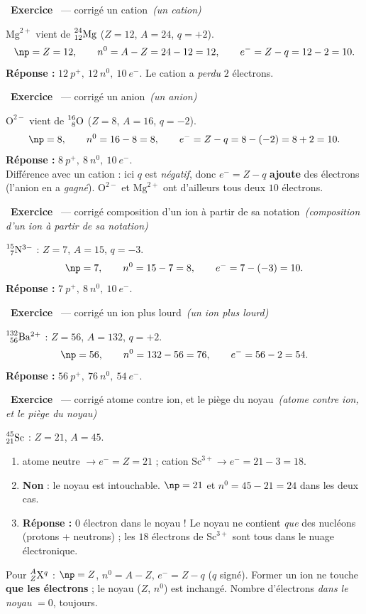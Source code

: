 \documentclass[11pt,a4paper]{article}
\newcommand{\nuc}[3]{\prescript{#1}{#2}{\mathrm{#3}}}
\newcommand{\pp}{p^{+}}
\newcommand{\ee}{e^{-}}
\newcommand{\nz}{n^{0}}
\newcommand{\rep}{\textbf{\color{excol}Réponse : }}
\newcounter{exo}
\newcommand{\cor}[1][]{\stepcounter{exo}\par\medskip%
  \noindent{\color{primary}\rule[-2pt]{3.5pt}{15pt}}\ \textbf{\color{primarydark}\large Exercice \theexo}%
  \ \textmd{\normalsize\color{black!55}— corrigé}%
  \ifx\relax#1\relax\relax\else\ \textmd{\normalsize\color{black!65}\itshape (#1)}\fi\par\nopagebreak\smallskip}
\begin{document}

\cor[un cation]
$\mathrm{Mg}^{2+}$ vient de $\nuc{24}{12}{Mg}$ ($Z=12$, $A=24$, $q=+2$).
\[ \np = Z = 12, \qquad \nz = A - Z = 24 - 12 = 12, \qquad \ee = Z - q = 12 - 2 = 10. \]
\rep $\boxed{12\ \pp,\ 12\ \nz,\ 10\ \ee}$. Le cation a \emph{perdu} $2$ électrons.

\cor[un anion]
$\mathrm{O}^{2-}$ vient de $\nuc{16}{8}{O}$ ($Z=8$, $A=16$, $q=-2$).
\[ \np = 8, \qquad \nz = 16 - 8 = 8, \qquad \ee = Z - q = 8 - (-2) = 8 + 2 = 10. \]
\rep $\boxed{8\ \pp,\ 8\ \nz,\ 10\ \ee}$. \\
Différence avec un cation : ici $q$ est \emph{négatif}, donc $\ee = Z - q$ \textbf{ajoute} des électrons
(l'anion en a \emph{gagné}). $\mathrm{O}^{2-}$ et $\mathrm{Mg}^{2+}$ ont d'ailleurs tous deux $10$
électrons.

\cor[composition d'un ion à partir de sa notation]
$\nuc{15}{7}{N}^{3-}$ : $Z = 7$, $A = 15$, $q = -3$.
\[ \np = 7, \qquad \nz = 15 - 7 = 8, \qquad \ee = 7 - (-3) = 10. \]
\rep $\boxed{7\ \pp,\ 8\ \nz,\ 10\ \ee}$.

\cor[un ion plus lourd]
$\nuc{132}{56}{Ba}^{2+}$ : $Z = 56$, $A = 132$, $q = +2$.
\[ \np = 56, \qquad \nz = 132 - 56 = 76, \qquad \ee = 56 - 2 = 54. \]
\rep $\boxed{56\ \pp,\ 76\ \nz,\ 54\ \ee}$.

\cor[atome contre ion, et le piège du noyau]
$\nuc{45}{21}{Sc}$ : $Z = 21$, $A = 45$.
\begin{enumerate}[label=\alph*)]
  \item atome neutre $\to \ee = Z = 21$ ; cation $\mathrm{Sc}^{3+} \to \ee = 21 - 3 = 18$.
  \item \textbf{Non} : le noyau est intouchable. $\np = 21$ et $\nz = 45 - 21 = 24$ dans les deux cas.
  \item \rep $\boxed{0}$ électron dans le noyau ! Le noyau ne contient \emph{que} des nucléons (protons +
        neutrons) ; les $18$ électrons de $\mathrm{Sc}^{3+}$ sont tous dans le nuage électronique.
\end{enumerate}

\begin{bilan}
Pour $\nuc{A}{Z}{X}^{q}$ : $\np = Z$, $\nz = A - Z$, $\ee = Z - q$ ($q$ signé). Former un ion ne touche
\textbf{que les électrons} ; le noyau ($Z$, $\nz$) est inchangé. Nombre d'électrons \emph{dans le noyau}
$= 0$, toujours.
\end{bilan}
\end{document}
